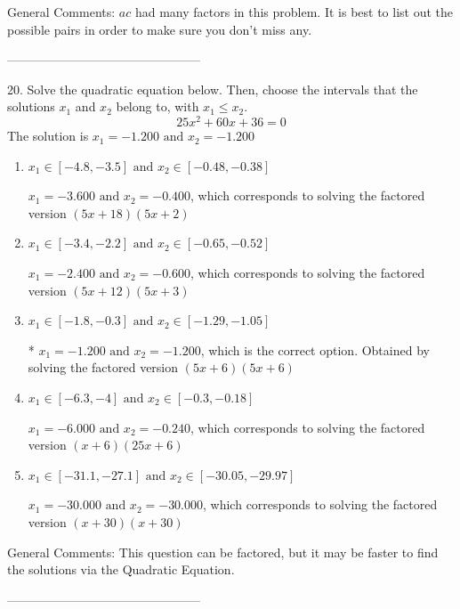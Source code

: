 \documentclass{article}[14pt]
\begin{document}
General Comments: $ac$ had many factors in this problem. It is best to list out the possible pairs in order to make sure you don't miss any.

-----------------------------------------------

20. Solve the quadratic equation below. Then, choose the intervals that the solutions $x_1$ and $x_2$ belong to, with $x_1 \leq x_2$.
$$ 25x^{2} +60 x + 36 = 0 $$ 
The solution is $ x_1 = -1.200 \text{ and } x_2 = -1.200 $ 

\begin{enumerate}[label=\Alph*.] 
\item $ x_1 \in [-4.8, -3.5] \text{ and } x_2 \in [-0.48, -0.38] $ 

 $x_1 = -3.600 \text{ and } x_2 = -0.400$, which corresponds to solving the factored version $(5x + 18)(5x + 2)$ 
\item $ x_1 \in [-3.4, -2.2] \text{ and } x_2 \in [-0.65, -0.52] $ 

 $x_1 = -2.400 \text{ and } x_2 = -0.600$, which corresponds to solving the factored version $(5x + 12)(5x + 3)$ 
\item $ x_1 \in [-1.8, -0.3] \text{ and } x_2 \in [-1.29, -1.05] $ 

 * $x_1 = -1.200 \text{ and } x_2 = -1.200$, which is the correct option. Obtained by solving the factored version $(5x + 6)(5x + 6)$ 
\item $ x_1 \in [-6.3, -4] \text{ and } x_2 \in [-0.3, -0.18] $ 

 $x_1 = -6.000 \text{ and } x_2 = -0.240$, which corresponds to solving the factored version $(x + 6)(25x + 6)$ 
\item $ x_1 \in [-31.1, -27.1] \text{ and } x_2 \in [-30.05, -29.97] $ 

 $x_1 = -30.000 \text{ and } x_2 = -30.000$, which corresponds to solving the factored version $(x + 30)(x + 30)$ 
\end{enumerate} 
 
General Comments: This question can be factored, but it may be faster to find the solutions via the Quadratic Equation.

-----------------------------------------------
\end{document}
